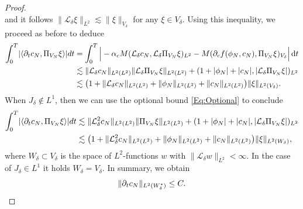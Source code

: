 \documentclass[]{article}
\newcommand{\dt}{\,\textup{d}t}
\DeclarePairedDelimiter{\abs}{\lvert}{\rvert}
\DeclarePairedDelimiter{\norm}{\lVert}{\rVert}
\begin{document}
\begin{proof}
\[	\]
	and it follows $\|\mathcal{L}_\delta \xi\|_{L^2} \lesssim \|\xi\|_{V_\delta}$ for any $\xi \in V_\delta$.
	Using this inequality, we proceed as before to deduce
	$$\begin{aligned}
		\int_0^T \abs{\langle \partial_t c_N, \Pi_{V_N} \xi \rangle} dt &= \int_0^T \Big|- \alpha_c M(\mathcal L_\delta c_N, \mathcal L_\delta \Pi_{V_N} \xi)_{L^2} - M (\partial_c f(\phi_N,c_N),\Pi_{V_N} \xi)_{V_\delta} \Big| \dt  \\
		&\lesssim \norm{\mathcal L_\delta c_N}_{L^2(L^2)}   \norm{\mathcal L_\delta \Pi_{V_N} \xi}_{L^2(L^2)}+(1+\abs{\phi_N}+\abs{c_N},\abs{\mathcal L_\delta\Pi_{V_N} \xi})_{L^2} \\
		&\lesssim  \big(1+\norm{\mathcal L_\delta c_N}_{L^2(L^2)}+\norm{\phi_N}_{L^2(L^2)}+\norm{c_N}_{L^2(L^2)}\big) \| \xi\|_{L^2(V_\delta)}. 
	\end{aligned}$$
	When $J_\delta \notin L^1$, then we can use the optional bound \eqref{Eq:Optional} to conclude
	$$\begin{aligned}
		\int_0^T \abs{\langle \partial_t c_N, \Pi_{V_N} \xi \rangle} dt 
		&\lesssim \norm{\mathcal L_\delta^2 c_N}_{L^2(L^2)}   \norm{\Pi_{V_N} \xi}_{L^2(L^2)}+(1+\abs{\phi_N}+\abs{c_N},\abs{\mathcal L_\delta\Pi_{V_N} \xi})_{L^2} \\
		&\lesssim  \big(1+\norm{\mathcal L_\delta^2 c_N}_{L^2(L^2)}+\norm{\phi_N}_{L^2(L^2)}+\norm{c_N}_{L^2(L^2)}\big) \| \xi\|_{L^2(W_\delta)},
	\end{aligned}$$
	where $W_\delta \subset V_\delta$ is the space of $L^2$-functions $w$ with $\|\mathcal L_\delta w\|_{L^2} < \infty$. In the case of $J_\delta \in L^1$ it holds $W_\delta=V_\delta$. In summary, we obtain
	\begin{equation} \label{Eq:Derivativebound2}\norm{\partial_t c_N}_{L^2(W_\delta^*)} \leq C.\end{equation}
	

\end{proof}
\end{document}
